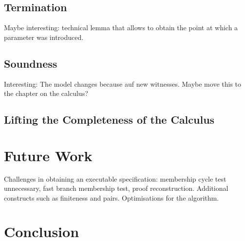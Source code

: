 \documentclass[sigplan,10pt,anonymous,review]{acmart}
\begin{document}
\subsection{Termination}
Maybe interesting: technical lemma that allows to obtain the point at which a parameter was introduced.
\subsection{Soundness}
Interesting: The model changes because auf new witnesses.
Maybe move this to the chapter on the calculus?
\subsection{Lifting the Completeness of the Calculus}

\section{Future Work}
Challenges in obtaining an executable specification: membership cycle test unnecessary, fast branch membership test, proof reconstruction.
Additional constructs such as finiteness and pairs.
Optimisations for the algorithm.

\section{Conclusion}

\begin{acks}
\end{acks}



\end{document}
